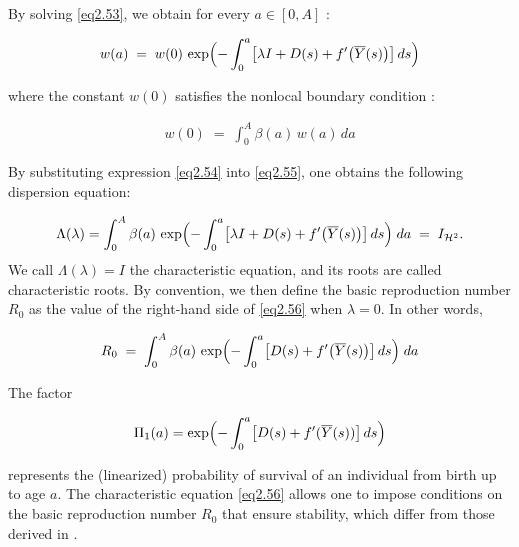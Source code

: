 \documentclass[10pt, a4paper]{amsart}
\theoremstyle{plain}
\theoremstyle{definition}
\theoremstyle{remark}
\numberwithin{equation}{section}
\begin{document}
By solving \eqref{eq2.53}, we obtain for every $a\in[0,A]$ :

\begin{align}\label{eq2.54}
    w(a)
  \;=\;
  w(0)\,\exp\Bigl(-\int_{0}^{a}\bigl[\lambda I + D(s) + f'\bigl(\overline{Y}(s)\bigr)\bigr]\,ds\Bigr)
\end{align}

where the constant $w(0)$ satisfies the nonlocal boundary condition :

\begin{align}\label{eq2.55}
     w(0)
  \;=\;
  \int_{0}^{A}\beta(a)\,w(a)\,da
\end{align}

By substituting expression \eqref{eq2.54} into \eqref{eq2.55}, one obtains the following dispersion equation:

\begin{align}\label{eq2.56}
   \Lambda(\lambda)= \int_{0}^{A}
    \beta(a)\,
    \exp\Bigl(-\int_{0}^{a}\bigl[\lambda I + D(s) + f'\bigl(\overline{Y}(s)\bigr)\bigr]\,ds\Bigr)
  \;da
  \;=\;I_{\mathcal{H}^2}.
\end{align}
We call $\Lambda(\lambda)=I$ the characteristic equation, and its roots  are called characteristic roots. 
By convention, we then define the basic reproduction number $R_{0}$ as the value of the right-hand side of \eqref{eq2.56} when $\lambda = 0$. In other words,

\begin{align}\label{eq2.57}
    R_{0}
    \;=\;
    \int_{0}^{A}
      \beta(a)\,
      \exp\Bigl(-\int_{0}^{a}\bigl[D(s) + f'\bigl(\overline{Y}(s)\bigr)\bigr]\,ds\Bigr)
    \;da
\end{align}

The factor

\begin{align}\label{eq2.58}
   \Pi_1(a)= \exp\Bigl(-\int_{0}^{a}\bigl[D(s) + f'(\overline{Y}(s))\bigr]\,ds\Bigr)
\end{align}

represents the (linearized) probability of survival of an individual from birth up to age $a$.    The characteristic equation \eqref{eq2.56} allows one to impose conditions on the basic reproduction number $R_0$ that ensure stability, which differ from those derived in \cite{ref45}.
\end{document}
